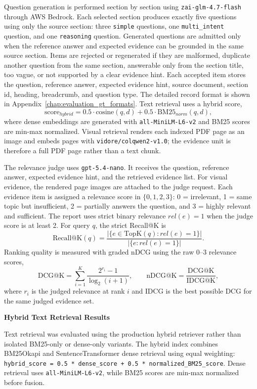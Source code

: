 Question generation is performed section by section using \texttt{zai-glm-4.7-flash} through AWS Bedrock. Each selected section produces exactly five questions using only the source section: three \texttt{simple} questions, one \texttt{multi\_intent} question, and one \texttt{reasoning} question. Generated questions are admitted only when the reference answer and expected evidence can be grounded in the same source section. Items are rejected or regenerated if they are malformed, duplicate another question from the same section, answerable only from the section title, too vague, or not supported by a clear evidence hint. Each accepted item stores the question, reference answer, expected evidence hint, source document, section id, heading, breadcrumb, and question type. The detailed record format is shown in Appendix~\ref{chap:evaluation_gt_formats}. Text retrieval uses a hybrid score,
\[
\mathrm{score}_{hybrid}=0.5 \cdot \mathrm{cosine}(q,d)+0.5 \cdot \mathrm{BM25}_{norm}(q,d),
\]
where dense embeddings are generated with \texttt{all-MiniLM-L6-v2} and BM25 scores are min-max normalized. Visual retrieval renders each indexed PDF page as an image and embeds pages with \texttt{vidore/colqwen2-v1.0}; the evidence unit is therefore a full PDF page rather than a text chunk.

The relevance judge uses \texttt{gpt-5.4-nano}. It receives the question, reference answer, expected evidence hint, and the retrieved evidence list. For visual evidence, the rendered page images are attached to the judge request. Each evidence item is assigned a relevance score in $\{0,1,2,3\}$: 0 = irrelevant, 1 = same topic but insufficient, 2 = partially answers the question, and 3 = highly relevant and sufficient. The report uses strict binary relevance $rel(e)=1$ when the judge score is at least 2. For query $q$, the strict Recall@K is
\[
\mathrm{Recall@K}(q)=\dfrac{|\{e \in \mathrm{TopK}(q): rel(e)=1\}|}{|\{e: rel(e)=1\}|}.
\]
Ranking quality is measured with graded nDCG using the raw 0--3 relevance scores,
\[
\mathrm{DCG@K}=\sum_{i=1}^{K}\dfrac{2^{r_i}-1}{\log_2(i+1)},\qquad
\mathrm{nDCG@K}=\dfrac{\mathrm{DCG@K}}{\mathrm{IDCG@K}},
\]
where $r_i$ is the judged relevance at rank $i$ and IDCG is the best possible DCG for the same judged evidence set.

\textbf{Hybrid Text Retrieval Results}

Text retrieval was evaluated using the production hybrid retriever rather than isolated BM25-only or dense-only variants. The hybrid index combines BM25Okapi and SentenceTransformer dense retrieval using equal weighting: \texttt{hybrid\_score = 0.5 * dense\_score + 0.5 * normalized\_BM25\_score}. Dense retrieval uses \texttt{all-MiniLM-L6-v2}, while BM25 scores are min-max normalized before fusion.

